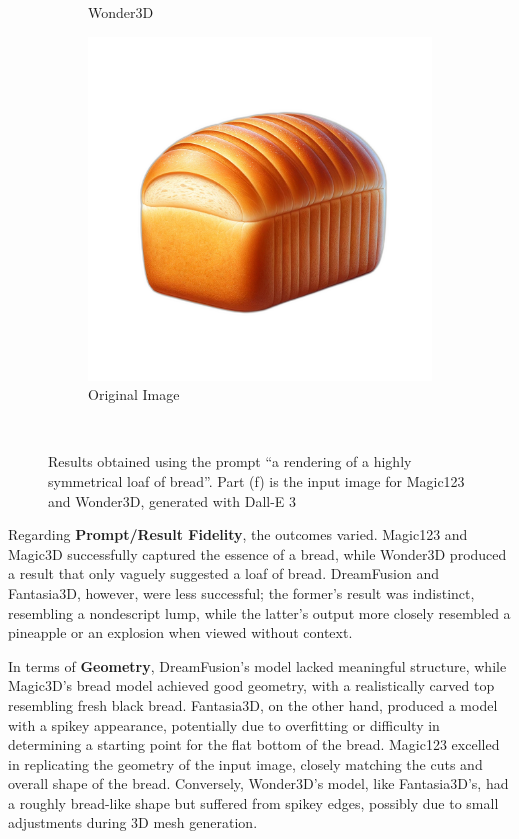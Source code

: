 \begin{figure}[ht]
\begin{subfigure}[b]{0.23\textwidth}
        \caption{Wonder3D}
        \vspace{0.1cm}
    \end{subfigure}
    \begin{subfigure}[b]{0.23\textwidth}
        \centering
        \includegraphics[width=\textwidth]{etc/Images/bread.png}
        \caption{Original Image}
        \vspace{0.1cm}
    \end{subfigure}
    \caption{Results obtained using the prompt ``a rendering of a highly symmetrical loaf of bread''. Part (f) is the input image for Magic123 and Wonder3D, generated with Dall-E 3}~\label{fig:resultBread}
\end{figure}

Regarding \textbf{Prompt/Result Fidelity}, the outcomes varied. Magic123 and Magic3D successfully captured the essence of a bread, while Wonder3D produced a result that only vaguely suggested a loaf of bread. DreamFusion and Fantasia3D, however, were less successful; the former's result was indistinct, resembling a nondescript lump, while the latter's output more closely resembled a pineapple or an explosion when viewed without context.

In terms of \textbf{Geometry}, DreamFusion's model lacked meaningful structure, while Magic3D's bread model achieved good geometry, with a realistically carved top resembling fresh black bread. Fantasia3D, on the other hand, produced a model with a spikey appearance, potentially due to overfitting or difficulty in determining a starting point for the flat bottom of the bread. Magic123 excelled in replicating the geometry of the input image, closely matching the cuts and overall shape of the bread. Conversely, Wonder3D's model, like Fantasia3D's, had a roughly bread-like shape but suffered from spikey edges, possibly due to small adjustments during 3D mesh generation.

